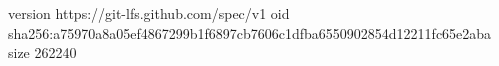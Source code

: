 version https://git-lfs.github.com/spec/v1
oid sha256:a75970a8a05ef4867299b1f6897cb7606c1dfba6550902854d12211fc65e2aba
size 262240
